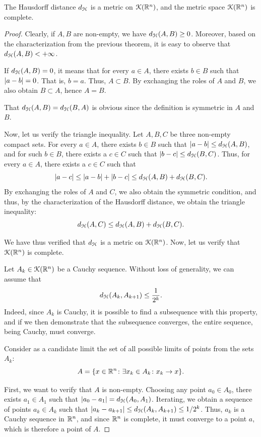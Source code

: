 \begin{theorem}
The Hausdorff distance $d_\mathcal H$ is a metric on $\mathcal K({\mathbb R}^n)$, and the metric space
$\mathcal K({\mathbb R}^n)$ is complete.
\end{theorem}
%
\begin{proof}
Clearly, if $A,B$ are non-empty, we have $d_\mathcal H(A,B) \ge 0$. Moreover, based on
the characterization from the previous theorem, it is easy to observe that
$d_\mathcal H(A,B) < +\infty$.

If $d_\mathcal H(A,B) = 0$, it means that for every $a\in A$, there exists $b\in B$ such
that ${\left|a-b\right|}=0$. That is, $b=a$. Thus, $A\subset B$. By exchanging the roles
of $A$ and $B$, we also obtain $B\subset A$, hence $A=B$.

That $d_\mathcal H(A,B) = d_\mathcal H(B,A)$ is obvious since the definition is symmetric in $A$
and $B$.

Now, let us verify the triangle inequality. Let $A,B,C$ be three non-empty
compact sets. For every $a\in A$, there exists $b\in B$ such that ${\left|a-b\right|} \le
d_\mathcal H(A,B)$, and for such $b \in B$, there exists a $c\in C$ such that ${\left|b-c\right|}
\le d_\mathcal H(B,C)$. Thus, for every $a\in A$, there exists a $c\in C$ such that
\[
  {\left|a-c\right|} \le {\left|a-b\right|} + {\left|b-c\right|} \le d_\mathcal H(A,B) + d_\mathcal H(B,C).
\]
By exchanging the roles of $A$ and $C$, we also obtain the symmetric condition,
and thus, by the characterization of the Hausdorff distance, we obtain the
triangle inequality:
\[
  d_\mathcal H(A,C) \le d_\mathcal H(A,B) + d_\mathcal H(B,C).
\]

We have thus verified that $d_\mathcal H$ is a metric on $\mathcal K({\mathbb R}^n)$. Now, let us verify
that $\mathcal K({\mathbb R}^n)$ is complete.

Let $A_k\in\mathcal K({\mathbb R}^n)$ be a Cauchy sequence. Without loss of generality, we can
assume that
\[
  d_\mathcal H(A_k,A_{k+1}) \le \frac{1}{2^k}.
\]
Indeed, since $A_k$ is Cauchy, it is possible to find a subsequence with this
property, and if we then demonstrate that the subsequence converges, the entire
sequence, being Cauchy, must converge.

Consider as a candidate limit the set of all possible limits of points from the
sets $A_k$:
\[
  A = {\left\{ x\in {\mathbb R}^n
  \colon \exists x_k \in A_k\colon x_k \to x \right\}}.
\]

First, we want to verify that $A$ is non-empty. Choosing any point $a_0 \in
A_0$, there exists $a_1 \in A_1$ such that ${\left|a_0 - a_1\right|} = d_\mathcal H(A_0,A_1)$.
Iterating, we obtain a sequence of points $a_k \in A_k$ such that ${\left|a_k -
a_{k+1}\right|} \le d_\mathcal H(A_k,A_{k+1}) \le 1/2^k$. Thus, $a_k$ is a Cauchy sequence in
${\mathbb R}^n$, and since ${\mathbb R}^n$ is complete, it must converge to a point $a$, which
is therefore a point of $A$.


\end{proof}
